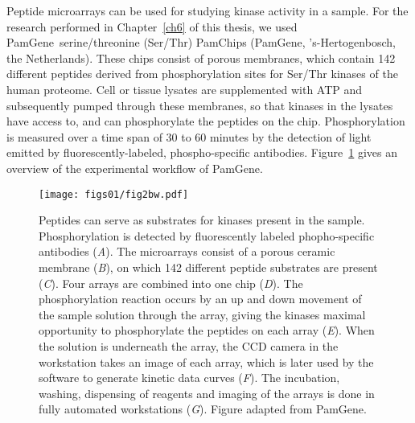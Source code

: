 Peptide microarrays can be used for studying kinase activity in a sample. For the research performed in Chapter~\ref{ch6} of this thesis, we used PamGene\textregistered~serine/threonine (Ser/Thr) PamChips (PamGene, 's-Hertogenbosch, the Netherlands). These chips consist of porous membranes, which contain 142 different peptides derived from phosphorylation sites for Ser/Thr kinases of the human proteome. Cell or tissue lysates are supplemented with ATP and subsequently pumped through these membranes, so that kinases in the lysates have access to, and can phosphorylate the peptides on the chip. Phosphorylation is measured over a time span of 30 to 60 minutes by the detection of light emitted by fluorescently\hyp{}labeled, phospho\hyp{}specific antibodies. Figure~\ref{fig1.2} gives an overview of the experimental workflow of PamGene.
%
\begin{figure}[htbp]
  \centering
  \begin{minipage}[b]{0.50\linewidth}
    \texttt{[image: figs01/fig2bw.pdf]}	%
  \end{minipage}
    \hfill
  \begin{minipage}[b]{0.46\linewidth}
    \caption{Peptides can serve as substrates for kinases present in the sample. Phosphorylation is detected by fluorescently labeled phopho\hyp{}specific antibodies ({\it A}). The microarrays consist of a porous ceramic membrane ({\it B}), on which 142 different peptide substrates are present ({\it C}). Four arrays are combined into one chip ({\it D}). The phosphorylation reaction occurs by an up and down movement of the sample solution through the array, giving the kinases maximal opportunity to phosphorylate the peptides on each array ({\it E}). When the solution is underneath the array, the CCD camera in the workstation takes an image of each array, which is later used by the software to generate kinetic data curves ({\it F}). The incubation, washing, dispensing of reagents and imaging of the arrays is done in fully automated workstations ({\it G}). Figure adapted from PamGene\textregistered.}
     \label{fig1.2}
     \end{minipage}
\end{figure}
%


